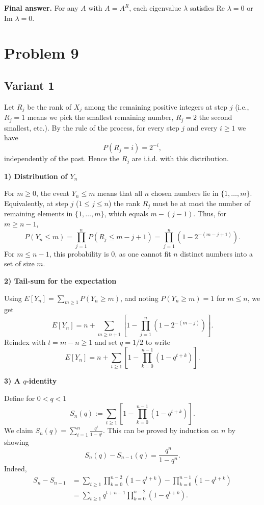 \documentclass[12pt,a4paper]{article}
\theoremstyle{definition}
\begin{document}
    \textbf{Final answer.}
    For any $A$ with $A = A^R$, each eigenvalue $\lambda$ satisfies $\text{Re } \lambda = 0$ or $\text{Im } \lambda = 0$.
    \section{Problem 9}
    \subsection{Variant 1}
    Let $R_j$ be the rank of $X_j$ among the remaining positive integers at step $j$ (i.e., $R_j=1$ means we pick the smallest remaining number, $R_j=2$ the second smallest, etc.). By the rule of the process, for every step $j$ and every $i \geq 1$ we have
    $$P(R_j=i) = 2^{-i},$$
    independently of the past. Hence the $R_j$ are i.i.d. with this distribution.

    \textbf{1) Distribution of $Y_n$}

    For $m \geq 0$, the event $Y_n \leq m$ means that all $n$ chosen numbers lie in $\{1, \ldots, m\}$. Equivalently, at step $j$ ($1 \leq j \leq n$) the rank $R_j$ must be at most the number of remaining elements in $\{1, \ldots, m\}$, which equals $m-(j-1)$. Thus, for $m \geq n-1$,
    $$P(Y_n \leq m) = \prod_{j=1}^n P(R_j \leq m-j+1) = \prod_{j=1}^n (1-2^{-(m-j+1)}).$$
    For $m \leq n-1$, this probability is 0, as one cannot fit $n$ distinct numbers into a set of size $m$.

    \textbf{2) Tail-sum for the expectation}

    Using $E[Y_n] = \sum_{m \geq 1} P(Y_n \geq m)$, and noting $P(Y_n \geq m) = 1$ for $m \leq n$, we get
    $$E[Y_n] = n + \sum_{m \geq n+1} \left[1 - \prod_{j=1}^n (1-2^{-(m-j)})\right].$$
    Reindex with $t = m-n \geq 1$ and set $q = 1/2$ to write
    $$E[Y_n] = n + \sum_{t \geq 1} \left[1 - \prod_{k=0}^{n-1} (1-q^{t+k})\right].$$

    \textbf{3) A $q$-identity}

    Define for $0 < q < 1$
    $$S_n(q) := \sum_{t \geq 1} \left[1 - \prod_{k=0}^{n-1} (1-q^{t+k})\right].$$
    We claim $S_n(q) = \sum_{i=1}^n \frac{q^i}{1-q^i}$. This can be proved by induction on $n$ by showing
    $$S_n(q) - S_{n-1}(q) = \frac{q^n}{1-q^n}.$$
    Indeed,
    \begin{align}
        S_n - S_{n-1} &= \sum_{t \geq 1} \prod_{k=0}^{n-2}(1-q^{t+k}) - \prod_{k=0}^{n-1}(1-q^{t+k})\\
        &= \sum_{t \geq 1} q^{t+n-1} \prod_{k=0}^{n-2}(1-q^{t+k}).
    \end{align}
\end{document}
